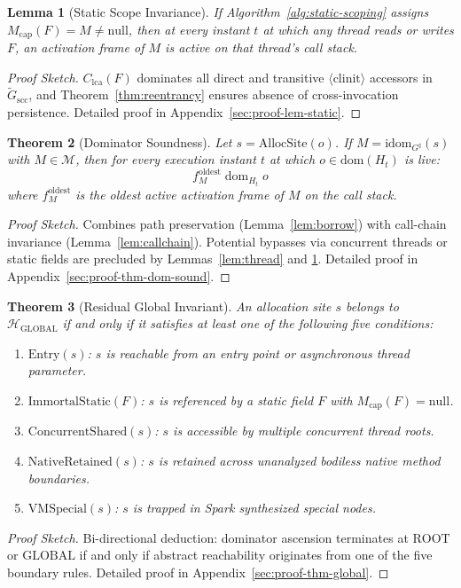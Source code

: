 \documentclass[12pt,a4paper]{article}
\newtheorem{theorem}{Theorem}[section]
\newtheorem{lemma}[theorem]{Lemma}
\newcommand{\GLOBAL}{\text{GLOBAL}}
\newcommand{\ROOT}{\text{ROOT}}
\newcommand{\idom}{\text{idom}}
\newcommand{\dom}{\mathrel{\text{dom}}}
\begin{document}
\begin{lemma}[Static Scope Invariance]
\label{lem:static}
If Algorithm~\ref{alg:static-scoping} assigns $M_{\text{cap}}(F) = M \neq \text{null}$, then at every instant $t$ at which any thread reads or writes $F$, an activation frame of $M$ is active on that thread's call stack.
\end{lemma}
\begin{proof}[Proof Sketch]
$C_{\text{lca}}(F)$ dominates all direct and transitive $\langle\text{clinit}\rangle$ accessors in $\widetilde{G}_{\text{scc}}$, and Theorem~\ref{thm:reentrancy} ensures absence of cross-invocation persistence. Detailed proof in Appendix~\ref{sec:proof-lem-static}.
\end{proof}

\begin{theorem}[Dominator Soundness]
\label{thm:dom-sound}
Let $s = \text{AllocSite}(o)$. If $M = \idom_{G^\sharp}(s)$ with $M \in \mathcal{M}$, then for every execution instant $t$ at which $o \in \text{dom}(H_t)$ is live:
\[
f_M^{\text{oldest}} \dom_{H_t} o
\]
where $f_M^{\text{oldest}}$ is the oldest active activation frame of $M$ on the call stack.
\end{theorem}
\begin{proof}[Proof Sketch]
Combines path preservation (Lemma~\ref{lem:borrow}) with call-chain invariance (Lemma~\ref{lem:callchain}). Potential bypasses via concurrent threads or static fields are precluded by Lemmas~\ref{lem:thread} and \ref{lem:static}. Detailed proof in Appendix~\ref{sec:proof-thm-dom-sound}.
\end{proof}

\begin{theorem}[Residual Global Invariant]
\label{thm:global}
An allocation site $s$ belongs to $\mathcal{H}_{\GLOBAL}$ if and only if it satisfies at least one of the following five conditions:
\begin{enumerate}
  \item $\text{Entry}(s)$: $s$ is reachable from an entry point or asynchronous thread parameter.
  \item $\text{ImmortalStatic}(F)$: $s$ is referenced by a static field $F$ with $M_{\text{cap}}(F) = \text{null}$.
  \item $\text{ConcurrentShared}(s)$: $s$ is accessible by multiple concurrent thread roots.
  \item $\text{NativeRetained}(s)$: $s$ is retained across unanalyzed bodiless native method boundaries.
  \item $\text{VMSpecial}(s)$: $s$ is trapped in Spark synthesized special nodes.
\end{enumerate}
\end{theorem}
\begin{proof}[Proof Sketch]
Bi-directional deduction: dominator ascension terminates at $\ROOT$ or $\GLOBAL$ if and only if abstract reachability originates from one of the five boundary rules. Detailed proof in Appendix~\ref{sec:proof-thm-global}.
\end{proof}
\end{document}
